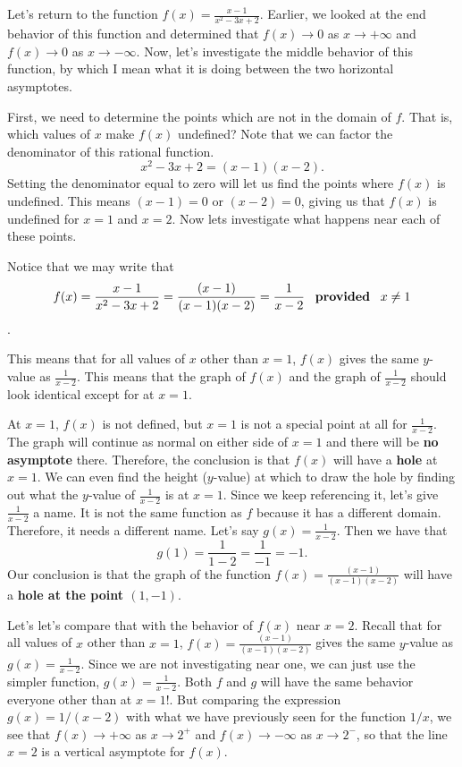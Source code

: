 \documentclass{ximera}
\begin{document}
\begin{example}
Let's return to the function $f(x) = \frac{x-1}{x^2-3x+2}$.  Earlier, we looked at the end behavior of this function and determined that $f(x) \to 0$ as $x \to +\infty$ and $f(x) \to 0$ as $x \to -\infty$.  Now, let's investigate the middle behavior of this function, by which I mean what it is doing between the two horizontal asymptotes.

First, we need to determine the points which are not in the domain of $f$.  That is, which values of $x$ make $f(x)$ undefined?  Note that we can factor the denominator of this rational function.  
$$x^2-3x+2 = (x-1)(x-2).$$
Setting the denominator equal to zero will let us find the points where $f(x)$ is undefined.  This means $(x-1)=0$ or $(x-2)=0$, giving us that $f(x)$ is undefined for $x=1$ and $x=2$. Now lets investigate what happens near each of these points.

Notice that we may write that $$   f(x) = \frac{x-1}{x^2-3x+2} = \frac{(x-1)}{(x-1)(x-2)} = \frac{1}{x-2} \text{\,\,\, \textbf{provided} \, } x \neq 1$$. 

This means that for all values of $x$ other than $x=1$, $f(x)$ gives the same $y$-value as $\frac{1}{x-2}$.  This means that the graph of $f(x)$ and the graph of $\frac{1}{x-2}$ should look identical except for at $x=1$.  

At $x=1$, $f(x)$ is not defined, but $x=1$ is not a special point at all for $\frac{1}{x-2}$.  The graph will continue as normal on either side of $x=1$ and there will be \textbf{no asymptote} there.  Therefore, the conclusion is that $f(x)$ will have a \textbf{hole} at $x=1$.   We can even find the height ($y$-value) at which to draw the hole by finding out what the $y$-value of $\frac{1}{x-2}$ is at $x=1$.  Since we keep referencing it, let's give $\frac{1}{x-2}$ a name.  It is not the same function as $f$ because it has a different domain.  Therefore, it needs a different name.  Let's say $g(x)=\frac{1}{x-2}$.  Then we have that 
$$g(1)=\frac{1}{1-2}=\frac{1}{-1}=-1.$$
Our conclusion is that the graph of the function $f(x)=\frac{(x-1)}{(x-1)(x-2)}$ will have a \textbf{hole at the point $(1,-1)$}.

Let's let's compare that with the behavior of $f(x)$ near $x=2$.  Recall that for all values of $x$ other than $x=1$, $f(x)=\frac{(x-1)}{(x-1)(x-2)}$ gives the same $y$-value as $g(x)=\frac{1}{x-2}$.  Since we are not investigating near one, we can just use the simpler function, $g(x)=\frac{1}{x-2}$.  Both $f$ and $g$ will have the same behavior everyone other than at $x=1$!.  But comparing the expression $g(x) = 1/(x-2)$ with what we have previously seen for the function $1/x$, we see that $f(x) \to +\infty$ as $x \to 2^+$ and $f(x) \to -\infty$ as $x \to 2^-$, so that the line $x=2$ is a vertical asymptote for $f(x)$. 
\end{example}
\end{document}
